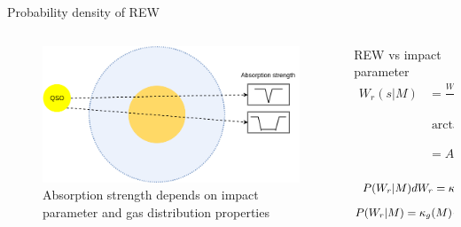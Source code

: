 \documentclass{beamer}
\begin{document}
		\begin{frame}{Probability density of REW}
			\begin{columns}
				\begin{column}{0.4\textwidth}
					\begin{figure}
						\includegraphics[width=\textwidth]{halo-absorb.png}
						\caption{\tiny Absorption strength depends on impact parameter and gas distribution properties}
						\label{fig:halo-absorb}
					\end{figure}
				\end{column}
				\begin{column}{0.6\textwidth}
					\begin{block}{REW vs impact parameter}
						\small{						$$
						\begin{aligned}
						W_r(s|M)&=\frac{W_0\sigma_{cl}f_g}{M_{cl}}\frac{2G_0}{\sqrt{s^2+a_h^2}}\times\\
						&\arctan{\frac{R_g^2-s^2}{s^2+a_h^2}}\\
						&=A_w\frac{2G_0}{\sqrt{s^2+a_h^2}}\arctan{\frac{R_g^2-s^2}{s^2+a_h^2}}
						\end{aligned}
						$$
					}
					\end{block}
					\begin{equation}
					\small{
						\begin{aligned}
							P(W_r|M)dW_r=\kappa_g(M)P(s|M)ds\\
							P(W_r|M)=\kappa_g(M)\frac{2s(W_r|M)}{R_g^2}\frac{ds}{dW_r}\\
						\end{aligned}
					}
					\end{equation}
				\end{column}
			\end{columns}
		\end{frame}
\end{document}
